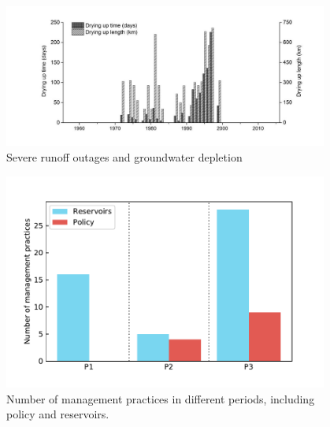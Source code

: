 \documentclass[9pt,twoside,lineno]{pnas-new}
\begin{document}
\begin{figure}
    \centering
    \includegraphics[width=0.95\textwidth]{../../figures/supplementary_information/outages.jpg}
    \caption{Severe runoff outages and groundwater depletion}
\end{figure}

\begin{figure}
    \centering
    \includegraphics[width=0.95\textwidth]{../../figures/supplementary_information/managements.pdf}
    \caption{Number of management practices in different periods, including policy and reservoirs.}
\end{figure}








\FloatBarrier




\end{document}
